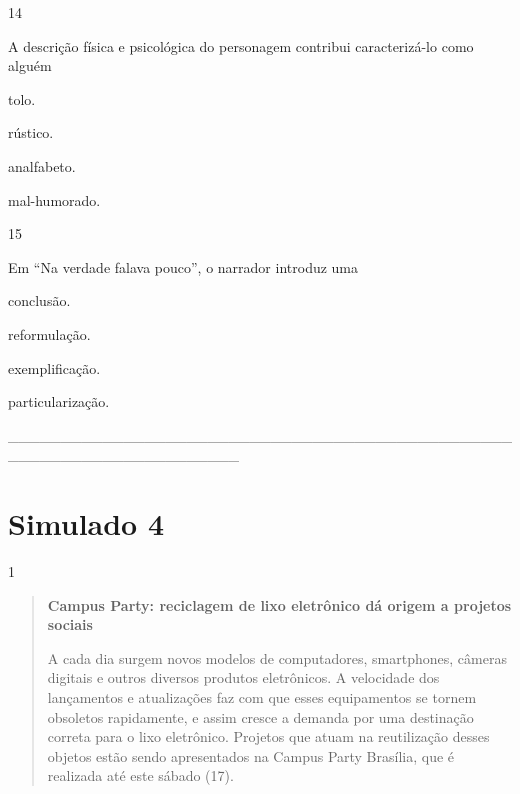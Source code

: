 
\num{14}

A descrição física e psicológica do personagem contribui caracterizá-lo
como alguém

\begin{escolha}
\item tolo.

\item rústico.

\item analfabeto.

\item mal-humorado.
\end{escolha}

\num{15}

Em ``Na verdade falava pouco'', o narrador introduz uma

\begin{escolha}
\item conclusão.

\item reformulação.

\item exemplificação.

\item particularização.
\end{escolha}

\_\_\_\_\_\_\_\_\_\_\_\_\_\_\_\_\_\_\_\_\_\_\_\_\_\_\_\_\_\_\_\_\_\_\_\_\_\_\_\_\_\_\_\_\_\_\_\_\_\_\_\_\_\_\_\_\_\_\_\_\_\_\_\_\_\_\_\_\_\_

\section{Simulado 4}

\num{1}

\begin{quote}
\textbf{Campus Party: reciclagem de lixo eletrônico dá origem a projetos
sociais}

A cada dia surgem novos modelos de computadores, smartphones, câmeras
digitais e outros diversos produtos eletrônicos. A velocidade dos
lançamentos e atualizações faz com que esses equipamentos se tornem
obsoletos rapidamente, e assim cresce a demanda por uma destinação
correta para o lixo eletrônico. Projetos que atuam na reutilização
desses objetos estão sendo apresentados na Campus Party Brasília, que é
realizada até este sábado (17).
\end{quote}

